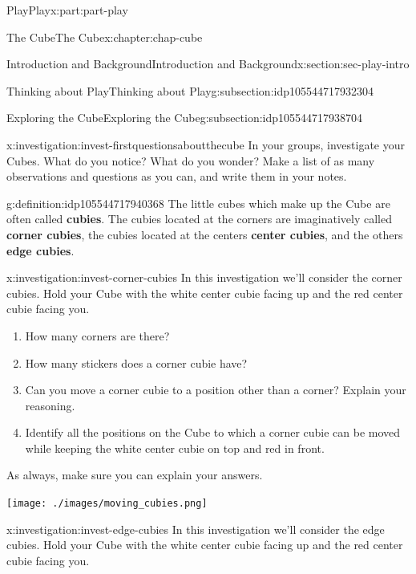 \documentclass[oneside,10pt,]{book}
\newcommand{\terminology}[1]{\textbf{#1}}
\numberwithin{equation}{section}
\begin{document}
\begin{partptx}{Play}{}{Play}{}{}{x:part:part-play}
\begin{chapterptx}{The Cube}{}{The Cube}{}{}{x:chapter:chap-cube}
\begin{sectionptx}{Introduction and Background}{}{Introduction and Background}{}{}{x:section:sec-play-intro}
\begin{subsectionptx}{Thinking about Play}{}{Thinking about Play}{}{}{g:subsection:idp105544717932304}
\end{subsectionptx}
%
%
\typeout{************************************************}
\typeout{************************************************}
%
\begin{subsectionptx}{Exploring the Cube}{}{Exploring the Cube}{}{}{g:subsection:idp105544717938704}
\begin{investigation}{}{x:investigation:invest-firstquestionsaboutthecube}%
In your groups, investigate your Cubes. What do you notice? What do you wonder? Make a list of as many observations and questions as you can, and write them in your notes.%
\end{investigation}%
\begin{definition}{}{g:definition:idp105544717940368}%
%
%
%
%
The little cubes which make up the Cube are often called \terminology{cubies}. The cubies located at the corners are imaginatively called \terminology{corner cubies}, the cubies located at the centers \terminology{center cubies}, and the others \terminology{edge cubies}.%
\end{definition}
\begin{investigation}{}{x:investigation:invest-corner-cubies}%
In this investigation we'll consider the corner cubies. Hold your Cube with the white center cubie facing up and the red center cubie facing you.%
\begin{enumerate}
\item{}How many corners are there?%
\item{}How many stickers does a corner cubie have?%
\item{}Can you move a corner cubie to a position other than a corner? Explain your reasoning.%
\item{}Identify all the positions on the Cube to which a corner cubie can be moved while keeping the white center cubie on top and red in front.%
\end{enumerate}
As always, make sure you can explain your answers.%
\begin{image}{0.25}{0.5}{0.25}%
\texttt{[image: ./images/moving\_cubies.png]}
\end{image}%
\end{investigation}%
\begin{investigation}{}{x:investigation:invest-edge-cubies}%
In this investigation we'll consider the edge cubies. Hold your Cube with the white center cubie facing up and the red center cubie facing you.%

\end{investigation}
\end{subsectionptx}
\end{sectionptx}
\end{chapterptx}
\end{partptx}
\end{document}
